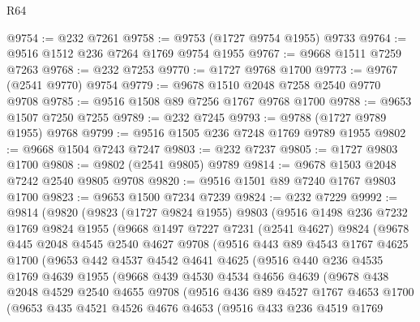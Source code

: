 \begin{lexlean}{R64}
\begin{coremodule}
@9754 := @232 @7261
@9758 := @9753 (@1727 @9754 @1955) @9733
@9764 := @9516 @1512 @236 @7264 @1769 @9754 @1955
@9767 := @9668 @1511 @7259 @7263
@9768 := @232 @7253
@9770 := @1727 @9768 @1700
@9773 := @9767 (@2541 @9770) @9754
@9779 := @9678 @1510 @2048 @7258 @2540 @9770 @9708
@9785 := @9516 @1508 @89 @7256 @1767 @9768 @1700
@9788 := @9653 @1507 @7250 @7255
@9789 := @232 @7245
@9793 := @9788 (@1727 @9789 @1955) @9768
@9799 := @9516 @1505 @236 @7248 @1769 @9789 @1955
@9802 := @9668 @1504 @7243 @7247
@9803 := @232 @7237
@9805 := @1727 @9803 @1700
@9808 := @9802 (@2541 @9805) @9789
@9814 := @9678 @1503 @2048 @7242 @2540 @9805 @9708
@9820 := @9516 @1501 @89 @7240 @1767 @9803 @1700
@9823 := @9653 @1500 @7234 @7239
@9824 := @232 @7229
@9992 := @9814
    (@9820
      (@9823
        (@1727 @9824 @1955)
        @9803
        (@9516
          @1498
          @236
          @7232
          @1769
          @9824
          @1955
          (@9668
            @1497
            @7227
            @7231
            (@2541 @4627)
            @9824
            (@9678
              @445
              @2048
              @4545
              @2540
              @4627
              @9708
              (@9516
                @443
                @89
                @4543
                @1767
                @4625
                @1700
                (@9653
                  @442
                  @4537
                  @4542
                  @4641
                  @4625
                  (@9516
                    @440
                    @236
                    @4535
                    @1769
                    @4639
                    @1955
                    (@9668
                      @439
                      @4530
                      @4534
                      @4656
                      @4639
                      (@9678
                        @438
                        @2048
                        @4529
                        @2540
                        @4655
                        @9708
                        (@9516
                          @436
                          @89
                          @4527
                          @1767
                          @4653
                          @1700
                          (@9653
                            @435
                            @4521
                            @4526
                            @4676
                            @4653
                            (@9516
                              @433
                              @236
                              @4519
                              @1769

\end{coremodule}
\end{lexlean}
